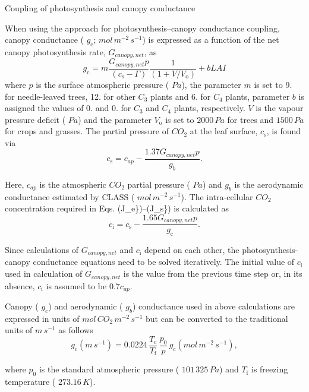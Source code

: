 Coupling of photosynthesis and canopy conductance

When using the \cite{Leuning1995-ab} approach for photosynthesis--canopy conductance coupling, canopy conductance ( $g_\mathrm{c}$; $mol\,m^{-2}\,s^{-1}$) is expressed as a function of the net canopy photosynthesis rate, $G_{canopy, net}$, as \[ \label{canopy_cond} g_\mathrm{c} = m \frac{G_{canopy,net} p}{(c_\mathrm{s} - \Gamma)}\frac{1}{(1+V/V_\mathrm{o})} + b {LAI} \] where $p$ is the surface atmospheric pressure ( $Pa$), the parameter $m$ is set to 9. for needle-\/leaved trees, 12. for other $C_3$ plants and 6. for $C_4$ plants, parameter $b$ is assigned the values of 0. and 0. for $C_3$ and $C_4$ plants, respectively. $V$ is the vapour pressure deficit ( $Pa$) and the parameter $V_\mathrm{o}$ is set to $2000\,Pa$ for trees and $1500\,Pa$ for crops and grasses. The partial pressure of $CO_2$ at the leaf surface, $c_\mathrm{s}$, is found via \[ \label{c_s} c_\mathrm{s} = c_{ap} - \frac{1.37 G_{canopy,net} p}{g_b}. \]

Here, $c_{ap}$ is the atmospheric $CO_2$ partial pressure ( $Pa$) and $g_b$ is the aerodynamic conductance estimated by C\+L\+A\+S\+S ( $mol\,m^{-2}\,s^{-1}$). The intra-\/cellular $CO_2$ concentration required in Eqs. (J\+\_\+e\})--(J\+\_\+s\}) is calculated as \[ \label{c_i} c_\mathrm{i} = c_\mathrm{s} - \frac{1.65 G_{canopy,net} p}{g_\mathrm{c}}. \]

Since calculations of $G_{canopy,net}$ and $c_\mathrm{i}$ depend on each other, the photosynthesis-\/canopy conductance equations need to be solved iteratively. The initial value of $c_\mathrm{i}$ used in calculation of $G_{canopy,net}$ is the value from the previous time step or, in its absence, $c_\mathrm{i}$ is assumed to be $0.7c_{ap}$.

Canopy ( $g_\mathrm{c}$) and aerodynamic ( $g_b$) conductance used in above calculations are expressed in units of $mol\,CO_2\,m^{-2}\,s^{-1}$ but can be converted to the traditional units of $m\,s^{-1}$ as follows \[ g_\mathrm{c} (m\,s^{-1}) = 0.0224\,\frac{T_\mathrm{c}}{T_\mathrm{f}}\,\frac{p_0}{p}\,g_\mathrm{c} (mol\,m^{-2}\,s^{-1}), \]

where $p_0$ is the standard atmospheric pressure ( $101\,325\,Pa$) and $T_\mathrm{f}$ is freezing temperature ( $273.16\,K$).

